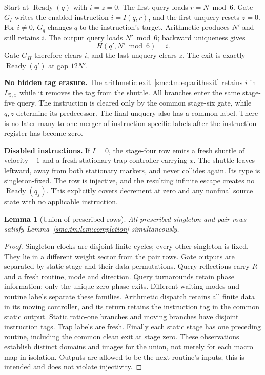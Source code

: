 \documentclass[11pt,letterpaper]{article}
\numberwithin{equation}{section}
\newtheorem{lemma}[theorem]{Lemma}
\theoremstyle{definition}
\theoremstyle{remark}
\newcommand{\Ready}{\operatorname{Ready}}
\begin{document}
Start at $\Ready(q)$ with $i=z=0$. The first query loads $r=N\bmod6$. Gate $G_I$ writes the enabled instruction $i=I(q,r)$, and the first unquery resets $z=0$. For $i\ne0$, $G_q$ changes $q$ to the instruction's target. Arithmetic produces $N'$ and still retains $i$. The output query loads $N'\bmod6$; backward uniqueness gives
\[
H(q',N'\bmod6)=i.
\]
Gate $G_H$ therefore clears $i$, and the last unquery clears $z$. The exit is exactly $\Ready(q')$ at gap $12N'$.

\textbf{No hidden tag erasure.} The arithmetic exit~\eqref{smc:tm:eq:arithexit} retains $i$ in $L_{5,x}$ while it removes the tag from the shuttle. All branches enter the same stage-five query. The instruction is cleared only by the common stage-six gate, while $q,z$ determine its predecessor. The final unquery also has a common label. There is no later many-to-one merger of instruction-specific labels after the instruction register has become zero.

\textbf{Disabled instructions.} If $I=0$, the stage-four row emits a fresh shuttle of velocity $-1$ and a fresh stationary trap controller carrying $x$. The shuttle leaves leftward, away from both stationary markers, and never collides again. Its type is singleton-fixed. The row is injective, and the resulting infinite escape creates no $\Ready(q_f)$. This explicitly covers decrement at zero and any nonfinal source state with no applicable instruction.

\begin{lemma}[Union of prescribed rows]\label{smc:tm:lem:union}
All prescribed singleton and pair rows satisfy Lemma~\ref{smc:tm:lem:completion} simultaneously.
\end{lemma}
\begin{proof}
Singleton clocks are disjoint finite cycles; every other singleton is fixed. They lie in a different weight sector from the pair rows. Gate outputs are separated by static stage and their data permutations. Query reflections carry $R$ and a fresh routine, mode and direction. Query turnarounds retain phase information; only the unique zero phase exits. Different waiting modes and routine labels separate these families. Arithmetic dispatch retains all finite data in its moving controller, and its return retains the instruction tag in the common static output. Static ratio-one branches and moving branches have disjoint instruction tags. Trap labels are fresh. Finally each static stage has one preceding routine, including the common clean exit at stage zero. These observations establish distinct domains and images for the union, not merely for each macro map in isolation. Outputs are allowed to be the next routine's inputs; this is intended and does not violate injectivity.
\end{proof}
\end{document}
